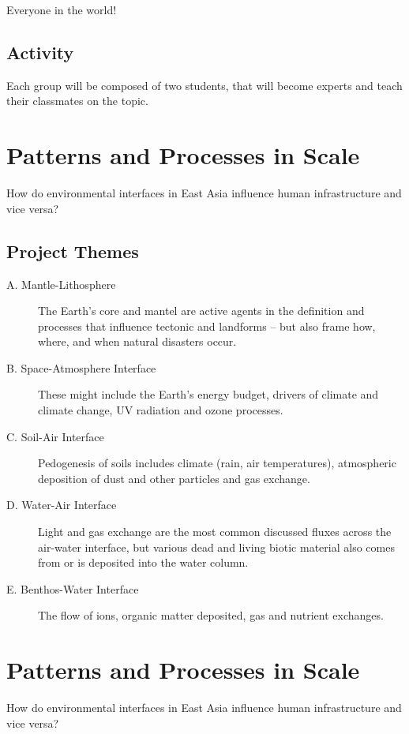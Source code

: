 Everyone in the world!

\subsection{Activity}

Each group will be composed of two students, that will become experts and teach their classmates on the topic. 


\section{Patterns and Processes in Scale}

How do environmental interfaces in East Asia influence human infrastructure and vice versa?

\subsection{Project Themes}

\begin{description}
	\item[A. Mantle-Lithosphere] The Earth's core and mantel are active agents in the definition and processes that influence tectonic and landforms -- but also frame how, where, and when natural disasters occur. 
	\item[B. Space-Atmosphere Interface] These might include the Earth's energy budget, drivers of climate and climate change, UV radiation and ozone processes.
	\item[C. Soil-Air Interface] Pedogenesis of soils includes climate (rain, air temperatures), atmospheric deposition of dust and other particles and gas exchange. 
	\item[D. Water-Air Interface] Light and gas exchange are the most common discussed fluxes across the air-water interface, but various dead and living biotic material also comes from or is deposited into the water column.
	\item[E. Benthos-Water Interface] The flow of ions, organic matter deposited, gas and nutrient exchanges.
\end{description}

\section{Patterns and Processes in Scale}

How do environmental interfaces in East Asia influence human infrastructure and vice versa?

